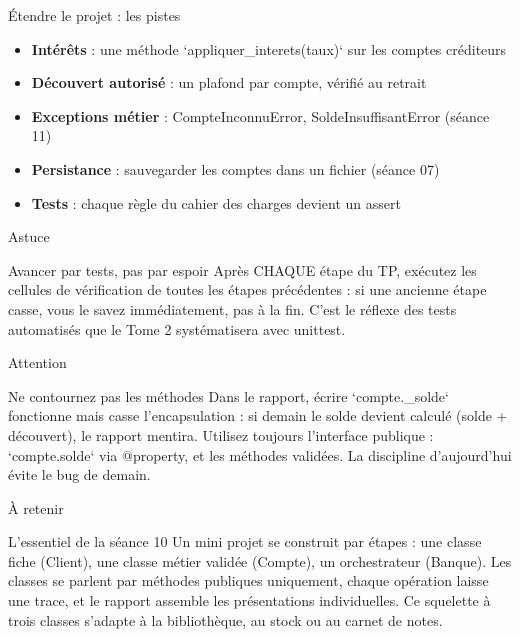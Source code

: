 \documentclass[aspectratio=169,11pt]{beamer}
\begin{document}
\begin{frame}{Étendre le projet : les pistes}
\begin{itemize}
  \item \textbf{Intérêts} : une méthode `appliquer\_interets(taux)` sur les comptes créditeurs
  \item \textbf{Découvert autorisé} : un plafond par compte, vérifié au retrait
  \item \textbf{Exceptions métier} : CompteInconnuError, SoldeInsuffisantError (séance 11)
  \item \textbf{Persistance} : sauvegarder les comptes dans un fichier (séance 07)
  \item \textbf{Tests} : chaque règle du cahier des charges devient un assert
\end{itemize}
\end{frame}

\begin{frame}{Astuce}
\begin{exampleblock}{Avancer par tests, pas par espoir}
Après CHAQUE étape du TP, exécutez les cellules de vérification de toutes les étapes précédentes : si une ancienne étape casse, vous le savez immédiatement, pas à la fin. C'est le réflexe des tests automatisés que le Tome 2 systématisera avec unittest.
\end{exampleblock}
\end{frame}

\begin{frame}{Attention}
\begin{alertblock}{Ne contournez pas les méthodes}
Dans le rapport, écrire `compte.\_solde` fonctionne mais casse l'encapsulation : si demain le solde devient calculé (solde + découvert), le rapport mentira. Utilisez toujours l'interface publique : `compte.solde` via @property, et les méthodes validées. La discipline d'aujourd'hui évite le bug de demain.
\end{alertblock}
\end{frame}

\begin{frame}{À retenir}
\begin{block}{L'essentiel de la séance 10}
Un mini projet se construit par étapes : une classe fiche (Client), une classe métier validée (Compte), un orchestrateur (Banque). Les classes se parlent par méthodes publiques uniquement, chaque opération laisse une trace, et le rapport assemble les présentations individuelles. Ce squelette à trois classes s'adapte à la bibliothèque, au stock ou au carnet de notes.
\end{block}
\end{frame}
\end{document}
